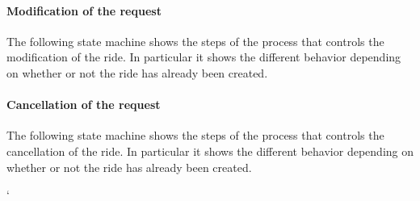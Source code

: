 \documentclass[a4paper,11pt]{report} %
\begin{document}
		\vspace*{1.1cm}
		
		\paragraph{Modification of the request} The following state machine shows the steps of the process that controls the modification of the ride. In particular it shows the different behavior depending on whether or not the ride has already been created.\\
		\noindent%
		\begin{minipage}{\linewidth}
		\end{minipage}	
		
		\pagebreak
		
		\paragraph{Cancellation of the request} The following state machine shows the steps of the process that controls the cancellation of the ride. In particular it shows the different behavior depending on whether or not the ride has already been created.\\
		\vspace*{1.1cm}
		
		\noindent%
		\begin{minipage}{\linewidth}
		\end{minipage}	`	
	
\end{document}
